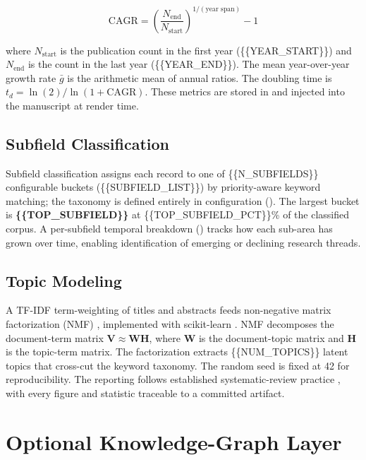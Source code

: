 \documentclass[
]{article}
\begin{document}
\[
\text{CAGR} = \left(\frac{N_{\text{end}}}{N_{\text{start}}}\right)^{1/(\text{year span})} - 1
\]

where \(N_{\text{start}}\) is the publication count in the first year
(\{\{YEAR\_START\}\}) and \(N_{\text{end}}\) is the count in the last
year (\{\{YEAR\_END\}\}). The mean year-over-year growth rate
\(\bar{g}\) is the arithmetic mean of annual ratios. The doubling time
is \(t_d = \ln(2) / \ln(1 + \text{CAGR})\). These metrics are stored in
 and injected into the manuscript at
render time.

\subsection{Subfield Classification}\label{subfield-classification}

Subfield classification assigns each record to one of
\{\{N\_SUBFIELDS\}\} configurable buckets (\{\{SUBFIELD\_LIST\}\}) by
priority-aware keyword matching; the taxonomy is defined entirely in
configuration (). The largest
bucket is \textbf{\{\{TOP\_SUBFIELD\}\}} at \{\{TOP\_SUBFIELD\_PCT\}\}\%
of the classified corpus. A per-subfield temporal breakdown
() tracks how each sub-area has grown
over time, enabling identification of emerging or declining research
threads.

\subsection{Topic Modeling}\label{topic-modeling}

A TF-IDF term-weighting of titles and abstracts \citep{salton1988term}
feeds non-negative matrix factorization (NMF) \citep{lee1999learning},
implemented with scikit-learn \citep{pedregosa2011scikit}. NMF
decomposes the document-term matrix
\(\mathbf{V} \approx \mathbf{W} \mathbf{H}\), where \(\mathbf{W}\) is
the document-topic matrix and \(\mathbf{H}\) is the topic-term matrix.
The factorization extracts \{\{NUM\_TOPICS\}\} latent topics that
cross-cut the keyword taxonomy. The random seed is fixed at 42 for
reproducibility. The reporting follows established systematic-review
practice \citep{page2021prisma}, with every figure and statistic
traceable to a committed artifact.

\newpage

\section{Optional Knowledge-Graph
Layer}\label{optional-knowledge-graph-layer}
\end{document}
